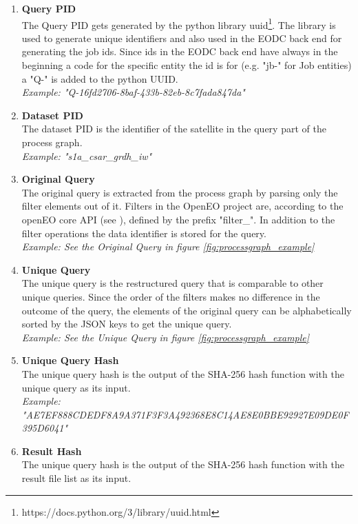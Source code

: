 \documentclass[draft,final]{vutinfth} %
\begin{document}
\begin{enumerate}
	\item \textbf{Query PID} \\
	The Query PID gets generated by the python library uuid\footnote{https://docs.python.org/3/library/uuid.html}. The library is used to generate unique identifiers and also used in the EODC back end for generating the job ids. Since ids in the EODC back end have always in the beginning a code for the specific entity the id is for (e.g. "jb-" for Job entities) a "Q-" is added to the python UUID. \\
	\textit{Example: "Q-16fd2706-8baf-433b-82eb-8c7fada847da"}
	\item \textbf{Dataset PID} \\
	The dataset PID is the identifier of the satellite in the query part of the process graph. \\
	\textit{Example: "s1a\_csar\_grdh\_iw"}	    	
	\item\textbf{Original Query} \\
	The original query is extracted from the process graph by parsing only the filter elements out of it. Filters in the OpenEO project are, according to the openEO core API (see \cite{openeo_api_desc}), defined by the prefix "filter\_". In addition to the filter operations the data identifier is stored for the query. \\
	\textit{Example: See the Original Query in figure \ref{fig:processgraph_example}}	 
	\item \textbf{Unique Query} \\
	The unique query is the restructured query that is comparable to other unique queries. Since the order of the filters makes no difference in the outcome of the query, the elements of the original query can be alphabetically sorted by the JSON keys to get the unique query. \\
	\textit{Example: See the Unique Query in figure \ref{fig:processgraph_example}}	  	 	
	\item \textbf{Unique Query Hash} \\
	The unique query hash is the output of the SHA-256 hash function with the unique query as its input. \\
	\textit{Example: "AE7EF888CDEDF8A9A371F3F3A492368E8C14AE8E0BBE92927E09DE0F395D6041"} 
	\item \textbf{Result Hash} \\
	The unique query hash is the output of the SHA-256 hash function with the result file list as its input. \\

\end{enumerate}
\end{document}
